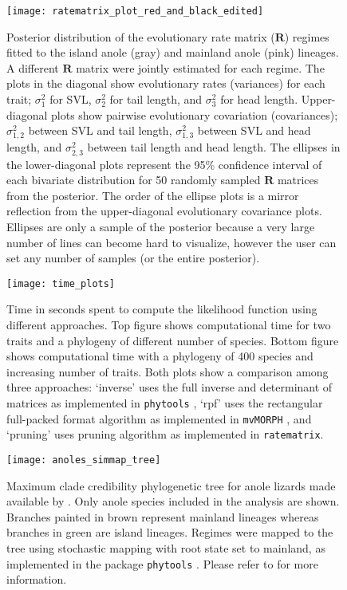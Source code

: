 \begin{figure}[h]
	\centering
	\texttt{[image: ratematrix\_plot\_red\_and\_black\_edited]}
	\caption[Posterior distribution of the evolutionary rate matrix ($\mathbf{R}$) regimes fitted to the island anole and mainland anole lineages.]{Posterior distribution of the evolutionary rate matrix ($\mathbf{R}$) regimes fitted to the island anole (gray) and mainland anole (pink) lineages. A different $\mathbf{R}$ matrix were jointly estimated for each regime. The plots in the diagonal show evolutionary rates (variances) for each trait; $\sigma_{1}^{2}$ for SVL, $\sigma_{2}^{2}$ for tail length, and $\sigma_{3}^{2}$ for head length. Upper-diagonal plots show pairwise evolutionary covariation (covariances); $\sigma_{1,2}^{2}$ between SVL and tail length, $\sigma_{1,3}^{2}$ between SVL and head length, and $\sigma_{2,3}^{2}$ between tail length and head length. The ellipses in the lower-diagonal plots represent the 95\% confidence interval of each bivariate distribution for 50 randomly sampled $\mathbf{R}$ matrices from the posterior. The order of the ellipse plots is a mirror reflection from the upper-diagonal evolutionary covariance plots. Ellipses are only a sample of the posterior because a very large number of lines can become hard to visualize, however the user can set any number of samples (or the entire posterior).}
	\label{fig:anolesGrid}
\end{figure}

\begin{figure}[h]
	\centering
	\texttt{[image: time\_plots]}
	\caption[Time in seconds spent to compute the likelihood function using different approaches.]{Time in seconds spent to compute the likelihood function using different approaches. Top figure shows computational time for two traits and a phylogeny of different number of species. Bottom figure shows computational time with a phylogeny of 400 species and increasing number of traits. Both plots show a comparison among three approaches: `inverse' uses the full inverse and determinant of matrices as implemented in \texttt{phytools} \citep{revell_phytools:_2012}, `rpf' uses the rectangular full-packed format algorithm as implemented in \texttt{mvMORPH} \citep{Clavel_mvmorph}, and `pruning' uses \citet{felsenstein_1973} pruning algorithm as implemented in \texttt{ratematrix}.}
	\label{fig:time_plot}
\end{figure}

\begin{figure}[h]
	\centering
	\texttt{[image: anoles\_simmap\_tree]}
	\caption[Maximum clade credibility phylogenetic tree for anole lizards made available by \citet{gamble_anolis_2014}.]{Maximum clade credibility phylogenetic tree for anole lizards made available by \citet{gamble_anolis_2014}. Only anole species included in the analysis are shown. Branches painted in brown represent mainland lineages whereas branches in green are island lineages. Regimes were mapped to the tree using stochastic mapping with root state set to mainland, as implemented in the package \texttt{phytools} \citep{revell_phytools:_2012}. Please refer to \citet{caetano_sysbio_2017} for more information.}
	\label{fig:anoles_simmap}
\end{figure}